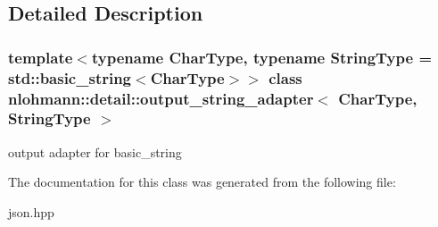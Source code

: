 \subsection{Detailed Description}
\subsubsection*{template$<$typename Char\+Type, typename String\+Type = std\+::basic\+\_\+string$<$\+Char\+Type$>$$>$\newline
class nlohmann\+::detail\+::output\+\_\+string\+\_\+adapter$<$ Char\+Type, String\+Type $>$}

output adapter for basic\+\_\+string 

The documentation for this class was generated from the following file\+:\begin{DoxyCompactItemize}
\item 
json.\+hpp\end{DoxyCompactItemize}
